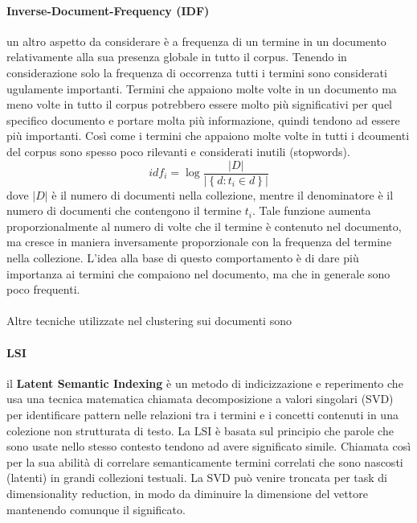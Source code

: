 \paragraph{Inverse-Document-Frequency (IDF)}un altro aspetto da considerare è a frequenza di un termine in un documento relativamente alla sua presenza globale in tutto il corpus. Tenendo in considerazione solo la frequenza di occorrenza tutti i termini sono considerati ugulamente importanti. Termini che appaiono molte volte in un documento ma meno volte in tutto il corpus potrebbero essere molto più significativi per quel specifico documento e portare molta più informazione, quindi tendono ad essere più importanti. Così come i termini che appaiono molte volte in tutti i dcoumenti del corpus sono spesso poco rilevanti e considerati inutili (stopwords).
\begin{equation}
	idf_i = \log \frac{|D|}{|\left \{ d : t_i \in d \right \}|}
\end{equation}
dove $ |D| $ è il numero di documenti nella collezione, mentre il denominatore è il numero di documenti che contengono il termine $t_i$.
Tale funzione aumenta proporzionalmente al numero di volte che il termine è contenuto nel documento, ma cresce in maniera inversamente proporzionale con la frequenza del termine nella collezione. L'idea alla base di questo comportamento è di dare più importanza ai termini che compaiono nel documento, ma che in generale sono poco frequenti.
\\\\
Altre tecniche utilizzate nel clustering sui documenti sono
\paragraph{LSI} il \textbf{Latent Semantic Indexing} è un metodo di indicizzazione e reperimento che usa una tecnica matematica chiamata decomposizione a valori singolari (SVD) per identificare pattern nelle relazioni tra i termini e i concetti contenuti in una colezione non strutturata di testo. La LSI è basata sul principio che parole che sono usate nello stesso contesto tendono ad avere significato simile. Chiamata così per la sua abilità di correlare semanticamente termini correlati che sono nascosti (latenti) in grandi collezioni testuali. La SVD può venire troncata per task di dimensionality reduction, in modo da diminuire la dimensione del vettore mantenendo comunque il significato.

